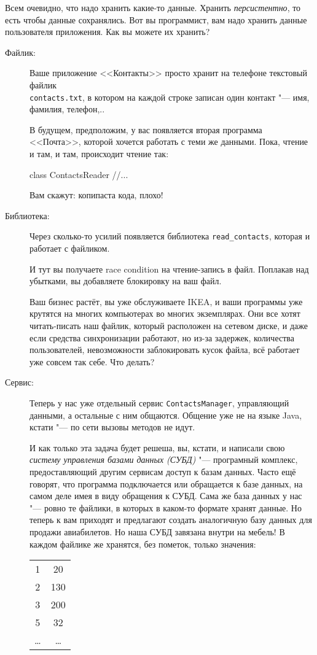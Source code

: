 Всем очевидно, что надо хранить какие-то данные.
Хранить \textit{персистентно}, то есть чтобы данные сохранялись.
Вот вы программист, вам надо хранить данные пользователя приложения.
Как вы можете их хранить?
\begin{description}
\item[Файлик:]
	Ваше приложение <<Контакты>> просто хранит на телефоне текстовый файлик \\\texttt{contacts.txt},
	в котором на каждой строке записан один контакт "--- имя, фамилия, телефон,..

	В будущем, предположим, у вас появляется вторая программа <<Почта>>, которой хочется работать с теми же данными.
	Пока, чтение и там, и там, происходит чтение так:
\begin{javacode}
class ContactsReader {
	//...
}
\end{javacode}
	Вам скажут: копипаста кода, плохо!

\item[Библиотека:]
	Через сколько-то усилий появляется библиотека \verb'read_contacts', которая и работает с файликом.

	И тут вы получаете race condition на чтение-запись в файл.
	Поплакав над убытками, вы добавляете блокировку на ваш файл.

	Ваш бизнес растёт, вы уже обслуживаете IKEA, и ваши программы уже крутятся на многих компьютерах во многих экземплярах.
	Они все хотят читать-писать наш файлик, который расположен на сетевом диске, и даже если средства синхронизации работают,
	но из-за задержек, количества пользователей, невозможности заблокировать кусок файла, всё работает уже совсем так себе.
	Что делать?

\item[Сервис:]
	Теперь у нас уже отдельный сервис \texttt{ContactsManager}, управляющий данными, а остальные с ним общаются.
	Общение уже не на языке Java, кстати "--- по сети вызовы методов не идут.

	И как только эта задача будет решеша, вы, кстати, и написали свою \textit{систему управления базами данных (СУБД)}
	"--- програмный комплекс, предоставляющий другим сервисам доступ к базам данных.
	Часто ещё говорят, что программа подключается или обращается к базе данных, на самом деле имея в виду обращения к СУБД.
	Сама же база данных у нас "--- ровно те файлики, в которых в каком-то формате хранят данные.
	Но теперь к вам приходят и предлагают создать аналогичную базу данных для продажи авиабилетов.
	Но наша СУБД завязана внутри на мебель!
	В каждом файлике же хранятся, без пометок, только значения:
	\begin{center}\begin{tabular}{|cc|}
		\hline
		1 & 20 \\
		2 & 130 \\
		3 & 200 \\
		5 & 32  \\
		\ldots & \ldots \\
		\hline
	\end{tabular}\end{center}


\end{description}
